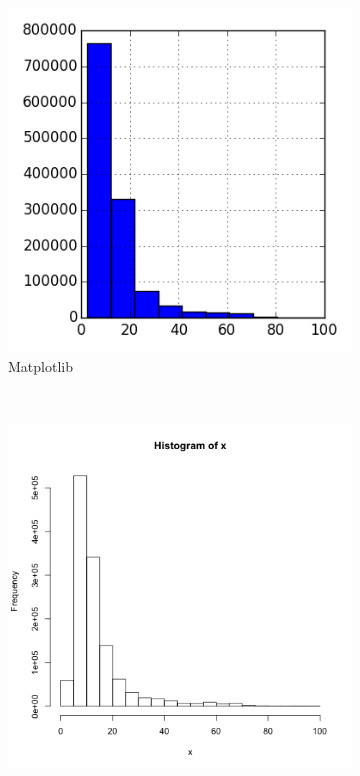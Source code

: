 \documentclass[]{article}
\begin{document}
\begin{figure}
        \centering
        \begin{subfigure}[b]{0.3\textwidth}
                \includegraphics[width=\textwidth]{matplotlib/histogram.png}
                \caption{Matplotlib}
        \end{subfigure}%
        ~ %
        \begin{subfigure}[b]{0.3\textwidth}
                \includegraphics[width=\textwidth]{R/histogram.png}

\end{subfigure}
\end{figure}
\end{document}
